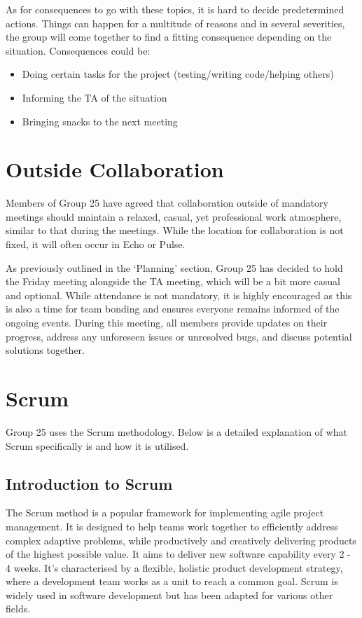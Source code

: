 \documentclass[sigconf,nonacm]{acmart}
\begin{document}
As for consequences to go with these topics, it is hard to decide predetermined actions. Things can happen for a multitude of reasons and in several severities, the group will come together to find a fitting consequence depending on the situation. Consequences could be:

\begin{itemize}
    \item Doing certain tasks for the project (testing/writing code/helping others)
    \item Informing the TA of the situation
    \item Bringing snacks to the next meeting
\end{itemize}

\section{Outside Collaboration}
Members of Group 25 have agreed that collaboration outside of mandatory meetings should maintain a relaxed, casual, yet professional work atmosphere, similar to that during the meetings. While the location for collaboration is not fixed, it will often occur in Echo or Pulse.

As previously outlined in the ‘Planning’ section, Group 25 has decided to hold the Friday meeting alongside the TA meeting, which will be a bit more casual and optional. While attendance is not mandatory, it is highly encouraged as this is also a time for team bonding and ensures everyone remains informed of the ongoing events. During this meeting, all members provide updates on their progress, address any unforeseen issues or unresolved bugs, and discuss potential solutions together.


\section{Scrum}
Group 25 uses the Scrum methodology. Below is a detailed explanation of what Scrum specifically is and how it is utilised.

\subsection{Introduction to Scrum}
The Scrum method is a popular framework for implementing agile project management. It is designed to help teams work together to efficiently address complex adaptive problems, while productively and creatively delivering products of the highest possible value. It aims to deliver new software capability every 2 - 4 weeks. It's characterised by a flexible, holistic product development strategy, where a development team works as a unit to reach a common goal. Scrum is widely used in software development but has been adapted for various other fields.
\end{document}

